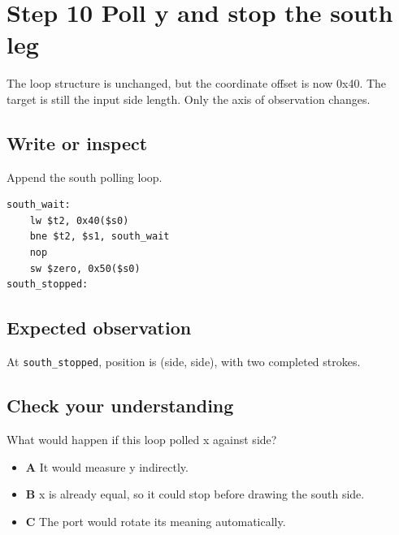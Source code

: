 \section{Step 10 Poll y and stop the south
  leg}\label{006-marsbot-square-s10-step-10-poll-y-and-stop-the-south-leg}

The loop structure is unchanged, but the coordinate offset is now 0x40.
The target is still the input side length. Only the axis of observation
changes.

\subsection{Write or
  inspect}\label{006-marsbot-square-s10-write-or-inspect}

Append the south polling loop.

\begin{verbatim}
south_wait:
    lw $t2, 0x40($s0)
    bne $t2, $s1, south_wait
    nop
    sw $zero, 0x50($s0)
south_stopped:
\end{verbatim}

\subsection{Expected
  observation}\label{006-marsbot-square-s10-expected-observation}

At \texttt{south\_stopped}, position is (side, side), with two completed
strokes.

\subsection{Check your
  understanding}\label{006-marsbot-square-s10-check-your-understanding}

What would happen if this loop polled x against side?

\begin{itemize}
  \tightlist
  \item
        \textbf{A} It would measure y indirectly.
  \item
        \textbf{B} x is already equal, so it could stop before drawing the
        south side.
  \item
        \textbf{C} The port would rotate its meaning automatically.
\end{itemize}
